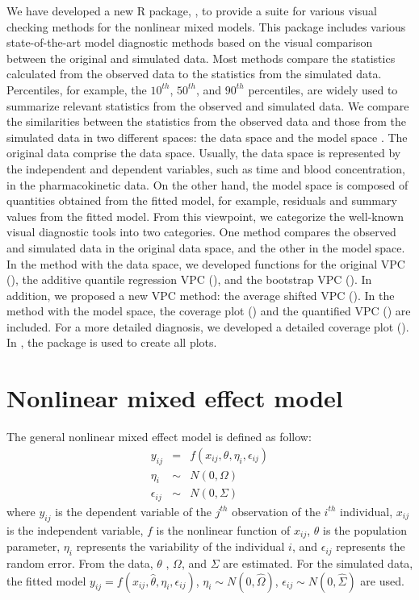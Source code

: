 We have developed a new R package, , to provide a suite for various visual checking methods for the nonlinear mixed models. This package includes various state-of-the-art model diagnostic methods based on the visual comparison between the original and simulated data. Most methods compare the statistics calculated from the observed data to the statistics from the simulated data. Percentiles, for example, the $10^{th}$, $50^{th}$, and $90^{th}$ percentiles, are widely used to summarize relevant statistics from the observed and simulated data. We compare the similarities between the statistics from the observed data and those from the simulated data in two different spaces: the data space and the model space \citep{wickham2015visualizing}. The original data comprise the data space. Usually, the data space is represented by the independent and dependent variables, such as time and blood concentration, in the pharmacokinetic data. On the other hand, the model space is composed of quantities obtained from the fitted model, for example, residuals and summary values from the fitted model. From this viewpoint, we categorize the well-known visual diagnostic tools into two categories. One method compares the observed and simulated data in the original data space, and the other in the model space. In the method with the data space, we developed functions for the original VPC (), the additive quantile regression VPC (), and the bootstrap VPC (). In addition, we proposed a new VPC method: the average shifted VPC (). In the method with the model space, the coverage plot () and the quantified VPC () are included. For a more detailed diagnosis, we developed a detailed coverage plot (). In , the  package \citep{ggplot2Hadley2nd} is used to create all plots.

\hypertarget{NLME}{%
\section{Nonlinear mixed effect model}\label{NLME}}

The general nonlinear mixed effect model is defined as follow:
\begin{eqnarray}
y_{ij} &=& f(x_{ij}, \theta, \eta_i, \epsilon_{ij}) \\
\eta_i &\sim& N(0,\Omega) \nonumber\\
\epsilon_{ij}  &\sim& N(0, \Sigma)\nonumber
\end{eqnarray}
where $y_{ij}$ is the dependent variable of the $j^{th}$ observation of the $i^{th}$ individual, $x_{ij}$ is the independent variable, $f$ is the nonlinear function of $x_{ij}$, $\theta$ is the population parameter, $\eta_i$ represents the variability of the individual $i$, and $\epsilon_{ij}$ represents the random error. From the data, $\theta$ , $\Omega$, and $\Sigma$ are estimated. For the simulated data, the fitted model $y_{ij} = f(x_{ij}, \hat{\theta}, \eta_i, \epsilon_{ij})$,  $\eta_i \sim N(0,\hat\Omega)$, $\epsilon_{ij}  \sim N(0, \hat\Sigma)$ are used.


